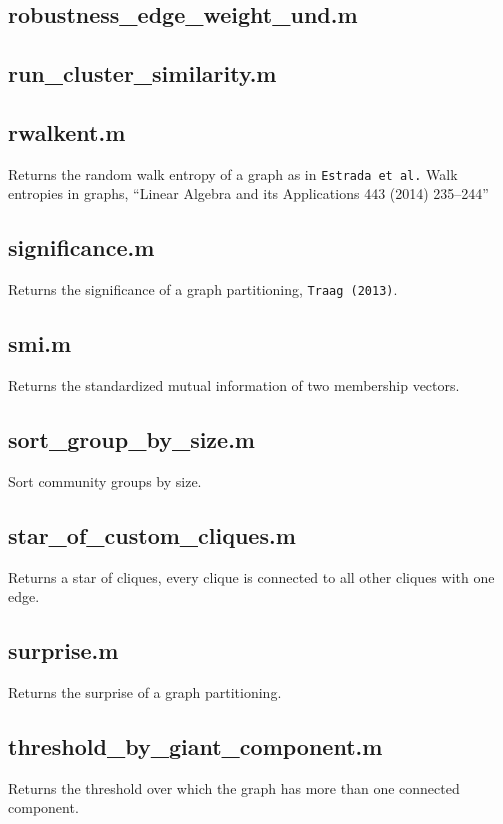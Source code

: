 \documentclass[a4paper]{report}
\begin{document}
  \subsection*{robustness\_edge\_weight\_und.m}

  \subsection*{run\_cluster\_similarity.m}

  \subsection*{rwalkent.m} Returns the random walk entropy of a graph as in
  \texttt{Estrada\ et\ al.} Walk entropies in graphs, ``Linear Algebra
  and its Applications 443 (2014) 235--244''

  \subsection*{significance.m} Returns the significance of a graph
  partitioning, \texttt{Traag\ (2013)}.

  \subsection*{smi.m} Returns the standardized mutual information of two
  membership vectors.

  \subsection*{sort\_group\_by\_size.m} Sort community groups by size.

  \subsection*{star\_of\_custom\_cliques.m} Returns a star of cliques, every
  clique is connected to all other cliques with one edge.

  \subsection*{surprise.m} Returns the surprise of a graph partitioning.

  \subsection*{threshold\_by\_giant\_component.m} Returns the threshold over
  which the graph has more than one connected component.
\end{document}

